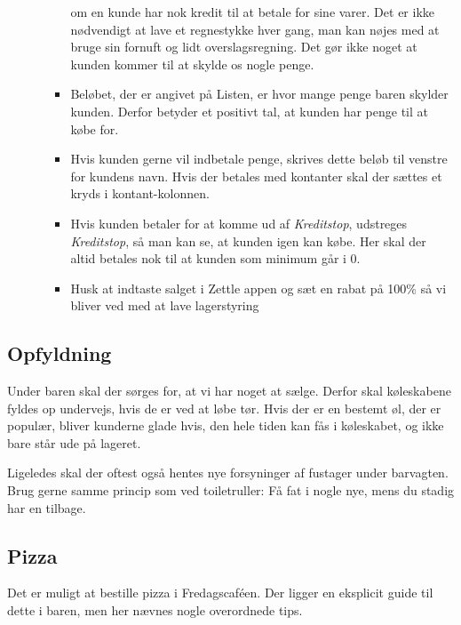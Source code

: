 \begin{itemize}
\begin{itemize}
\begin{itemize}
      om en kunde har nok kredit til at betale for sine varer.
      Det er ikke nødvendigt at lave et regnestykke hver gang, man kan nøjes
      med at bruge sin fornuft og lidt overslagsregning.
      Det gør ikke noget at kunden kommer til at skylde os nogle penge.
    \item Beløbet, der er angivet på Listen, er hvor mange penge baren skylder kunden.
      Derfor betyder et positivt tal, at kunden har penge til at købe for.
    \item Hvis kunden gerne vil indbetale penge, skrives dette beløb
      til venstre for kundens navn.
      Hvis der betales med kontanter skal der sættes et kryds i kontant-kolonnen.
    \item Hvis kunden betaler for at komme ud af \emph{Kreditstop},
      udstreges \emph{Kreditstop}, så man kan se, at kunden igen kan
      købe. Her skal der altid betales nok til at kunden som minimum går i 0.
    \item Husk at indtaste salget i Zettle appen og sæt en rabat på 100\% så vi bliver ved med at lave lagerstyring
    \end{itemize}
  \end{itemize}
\end{itemize}

\subsection{Opfyldning}
\label{sec:intra:opfyldning}

Under baren skal der sørges for, at vi har noget at sælge. Derfor skal
køleskabene fyldes op undervejs, hvis de er ved at løbe tør. Hvis der
er en bestemt øl, der er populær, bliver kunderne glade hvis, den hele
tiden kan fås i køleskabet, og ikke bare står ude på lageret.

Ligeledes skal der oftest også hentes nye forsyninger af fustager
under barvagten. Brug gerne samme princip som ved toiletruller: Få fat
i nogle nye, mens du stadig har en tilbage.

\subsection{Pizza}
\label{sec:intra:pizza}

Det er muligt at bestille pizza i Fredagscaféen. Der ligger en
eksplicit guide til dette i baren, men her nævnes nogle overordnede tips.

